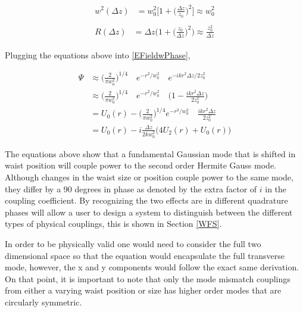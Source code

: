 		\begin{subequations}
		\begin{align}
		\begin{split}
			w^2(\Delta z)	&= 	w^2_0 \bigg[1 + \bigg(\frac{\Delta z}{z_0}  \bigg)^2 \bigg]  \approx	w^2_0
		\end{split}\\
		\begin{split}
			R(\Delta z) 	&=	\Delta z \bigg(1 + \bigg(\frac{z_0}{\Delta z}\bigg)^2\bigg) \approx	\frac{z_0^2}{\Delta z}
		\end{split}
		\end{align}
		\end{subequations}

		Plugging the equations above into \ref{EFieldwPhase},
		
		\begin{equation}
		\begin{aligned}
		\Psi 	&\approx	\bigg( \frac{2}{\pi w_0^2} \bigg)^{1/4} \quad e^{-r^2/w_0^2} \quad e^{-ikr^2 \Delta z /2 z_0^2}
		\\		&\approx	\bigg( \frac{2}{\pi w_0^2} \bigg)^{1/4} \quad e^{-r^2/w_0^2} \quad \bigg( 1-\frac{ikr^2 \Delta z}{2 z_0^2}  \bigg)
		\\		&=			U_0(r) - \bigg( \frac{2}{\pi w_0^2} \bigg)^{1/4} e^{-r^2/w_0^2} \quad \frac{ikr^2 \Delta z}{2 z_0^2}
		\\		&=			U_0(r) - i \frac{\Delta z}{2k w_0^2} \bigg( 4U_2(r) + U_0(r) \bigg)
		\end{aligned}
		\end{equation}
		
		The equations above show that a fundamental Gaussian mode that is shifted in waist position will couple power to the second order Hermite Gauss mode.  Although changes in the waist size or position couple power to the same mode, they differ by a 90 degrees in phase as denoted by the extra factor of $i$ in the coupling coefficient.  By recognizing the two effects are in different quadrature phases will allow a user to design a system to distinguish between the different types of physical couplings, this is shown in Section \ref{WFS}.
		
		 In order to be physically valid one would need to consider the full two dimensional space so that the equation would encapsulate the full transverse mode, however, the x and y components would follow the exact same derivation. On that point, it is important to note that only the mode mismatch couplings from either a varying waist position or size has higher order modes that are circularly symmetric.
		

